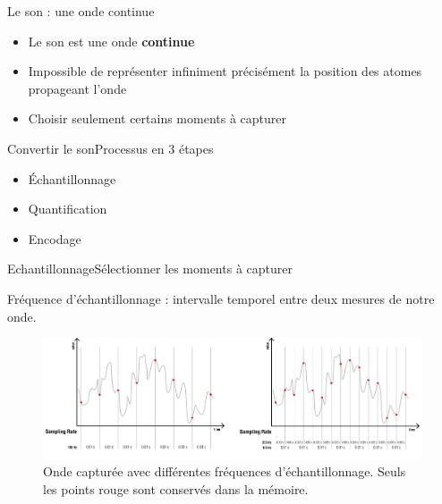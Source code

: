 \documentclass{beamer}
\begin{document}
\begin{frame}{Le son : une onde continue}{}
	\begin{itemize}
		\item Le son est une onde \textbf{continue}
		\item Impossible de représenter infiniment précisément la position des atomes propageant l'onde
		\item Choisir seulement certains moments à capturer
	\end{itemize}
\end{frame}

\begin{frame}{Convertir le son}{Processus en 3 étapes}

	\begin{itemize}
		\item<1-> Échantillonnage
		\item<2-> Quantification
		\item<3-> Encodage
	\end{itemize}

\end{frame}

\begin{frame}{Echantillonnage}{Sélectionner les moments à capturer}
	\begin{definition}
		Fréquence d'échantillonnage : intervalle temporel entre deux mesures de notre onde.
	\end{definition}
	\begin{figure}
		\includegraphics[width=1\linewidth]{numerisation-01.png}
		\caption{Onde capturée avec différentes fréquences d'échantillonnage. Seuls les points rouge sont conservés dans la mémoire.}
	\end{figure}

\end{frame}
\end{document}
